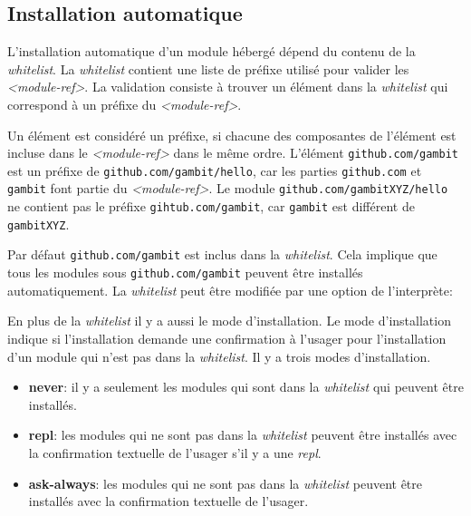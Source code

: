 \subsection{Installation automatique}
%
L'installation automatique d'un module hébergé dépend du contenu de la
\textit{whitelist}.  La \textit{whitelist} contient une liste de préfixe
utilisé pour valider les \textit{<module-ref>}. La validation consiste
à trouver un élément dans la \textit{whitelist} qui correspond à un
préfixe du \textit{<module-ref>}.

Un élément est considéré un préfixe, si chacune des composantes de l'élément
est incluse dans le \textit{<module-ref>} dans le même ordre. L'élément
\texttt{github.com/gambit} est un préfixe de \texttt{github.com/gambit/hello},
car les parties \texttt{github.com} et \texttt{gambit} font partie du
\textit{<module-ref>}. Le module \texttt{github.com/gambitXYZ/hello} ne
contient pas le préfixe \texttt{gihtub.com/gambit}, car \texttt{gambit} est
différent de \texttt{gambitXYZ}.

Par défaut \texttt{github.com/gambit} est inclus dans la \textit{whitelist}.
Cela implique que tous les modules sous \texttt{github.com/gambit}
peuvent être installés automatiquement. La \textit{whitelist} peut
être modifiée par une option de l'interprète:

\begin{center}
\end{center}

En plus de la \textit{whitelist} il y a aussi le mode d'installation.
Le mode d'installation indique si l'installation demande une confirmation
à l'usager pour l'installation d'un module qui n'est pas dans la
\textit{whitelist}. Il y a trois modes d'installation.
\begin{itemize}
  \item \textbf{never}: il y a seulement les modules qui sont dans la
    \textit{whitelist} qui peuvent être installés.

  \item \textbf{repl}: les modules qui ne sont pas dans la \textit{whitelist}
    peuvent être installés avec la confirmation textuelle de l'usager s'il y a
    une \textit{repl}.

  \item \textbf{ask-always}: les modules qui ne sont pas dans la \textit{whitelist}
    peuvent être installés avec la confirmation textuelle de l'usager.
\end{itemize}

